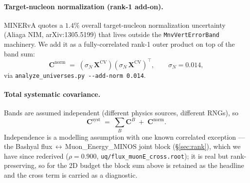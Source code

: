 \documentclass[12pt]{article}
\newcommand{\CV}{\text{CV}}
\newcommand{\syst}{\text{syst}}
\newcommand{\T}{^{\!\top}}
\begin{document}
\paragraph{Target-nucleon normalization (rank-1 add-on).}
MINERvA quotes a $1.4\%$ overall target-nucleon normalization
uncertainty (Aliaga NIM, arXiv:1305.5199) that lives outside the
\texttt{MnvVertErrorBand} machinery. We add it as a fully-correlated
rank-1 outer product on top of the band sum:
\begin{equation}
\mathbf{C}^{\text{norm}} \;=\; (\sigma_{N}\,\mathbf{X}^{\CV})(\sigma_{N}\,\mathbf{X}^{\CV})\T,
\qquad \sigma_{N} = 0.014,
\label{eq:normband}
\end{equation}
via \texttt{analyze\_universes.py -{}-add-norm 0.014}.

\paragraph{Total systematic covariance.}
Bands are assumed independent (different physics sources, different
RNGs), so
\begin{equation}
\mathbf{C}^{\syst}
\;=\;
\sum_{B}\mathbf{C}^{B}\;+\;\mathbf{C}^{\text{norm}}.
\label{eq:systblocksum}
\end{equation}
Independence is a modelling assumption with one known correlated exception --- the
Bashyal flux\,$\leftrightarrow$\,Muon\_Energy\_MINOS joint block
(\S\ref{sec:rank}), which we have since rederived ($\rho=0.900$,
\texttt{uq/flux\_muonE\_cross.root}); it is real but rank-preserving, so for the
2D budget the block sum above is retained as the headline and the cross term is
carried as a diagnostic.
\end{document}
